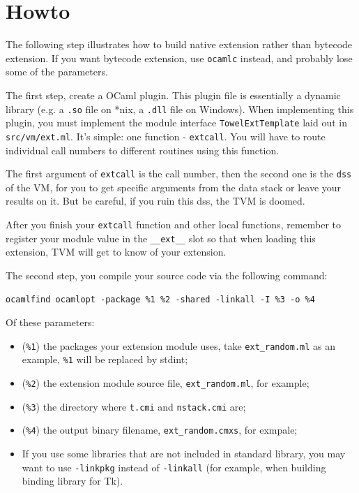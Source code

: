 \documentclass{report}
\begin{document}
\section{Howto}

\begin{mdframed}[style=hint]
  The following step illustrates how to build native extension rather
  than bytecode extension. If you want bytecode extension, use
  \texttt{ocamlc} instead, and probably lose some of the parameters.
\end{mdframed}

The first step, create a OCaml plugin. This plugin file is essentially a dynamic library (e.g. a \texttt{.so} file on *nix, a \texttt{.dll} file on Windows). When implementing this plugin, you must implement the module interface \texttt{TowelExtTemplate} laid out in \texttt{src/vm/ext.ml}. It's simple: one function - \texttt{extcall}. You will have to route individual call numbers to different routines using this function.

The first argument of \texttt{extcall} is the call number, then the second one is the \texttt{dss} of the VM, for you to get specific arguments from the data stack or leave your results on it. But be careful, if you ruin this dss, the TVM is doomed.

After you finish your \texttt{extcall} function and other local functions, remember to register your module value in the \texttt{\_\_ext\_\_} slot so that when loading this extension, TVM will get to know of your extension.

The second step, you compile your source code via the following command:

\begin{mdframed}[style=example]
  \texttt{ocamlfind ocamlopt -package \%1 \%2 -shared -linkall -I \%3
    -o \%4}
\end{mdframed}
Of these parameters:
\begin{itemize}
\item (\texttt{\%1}) the packages your extension module uses, take \texttt{ext\_random.ml} as an example, \texttt{\%1} will be replaced by stdint;
\item (\texttt{\%2}) the extension module source file, \texttt{ext\_random.ml}, for example;
\item (\texttt{\%3}) the directory where \texttt{t.cmi} and \texttt{nstack.cmi} are;
\item (\texttt{\%4}) the output binary filename, \texttt{ext\_random.cmxs}, for exmpale;
\item If you use some libraries that are not included in standard library, you may want to use \texttt{-linkpkg} instead of \texttt{-linkall} (for example, when building binding library for Tk).
\end{itemize}
\end{document}
